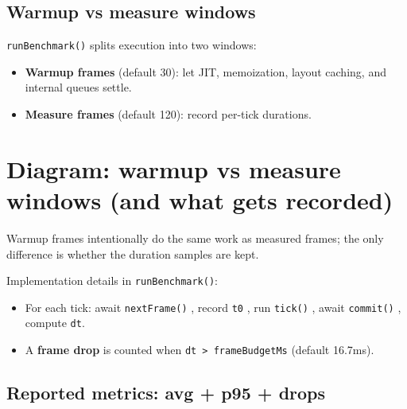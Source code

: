 \subsection{Warmup vs measure windows}

\texttt{runBenchmark()} splits execution into two windows:

\begin{itemize}
\item \textbf{Warmup frames} (default 30): let JIT, memoization, layout caching, and internal queues settle.
\item \textbf{Measure frames} (default 120): record per-tick durations.
\end{itemize}

\section*{Diagram: warmup vs measure windows (and what gets recorded)}
\begin{center}
\end{center}

Warmup frames intentionally do the same work as measured frames; the only difference is whether the duration samples are kept.

Implementation details in \texttt{runBenchmark()}:

\begin{itemize}
\item For each tick: await \texttt{nextFrame()} , record \texttt{t0} , run \texttt{tick()} , await \texttt{commit()} , compute \texttt{dt}.
\item A \textbf{frame drop} is counted when \texttt{dt > frameBudgetMs} (default 16.7ms).
\end{itemize}

\subsection{Reported metrics: avg + p95 + drops}

